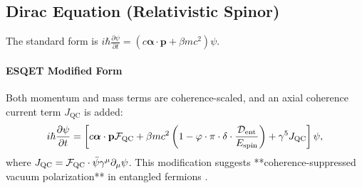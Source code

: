 \subsection{Dirac Equation (Relativistic Spinor)}

The standard form is $i \hbar \frac{\partial \psi}{\partial t} = \left( c \boldsymbol{\alpha} \cdot \mathbf{p} + \beta m c^2 \right) \psi$.

\paragraph{ESQET Modified Form}
Both momentum and mass terms are coherence-scaled, and an axial coherence current term $J_{\text{QC}}$ is added:
\[
i \hbar \frac{\partial \psi}{\partial t} = \left[ c \boldsymbol{\alpha} \cdot \mathbf{p} \mathcal{F}_{\text{QC}} + \beta m c^2 \left(1 - \varphi \cdot \pi \cdot \mathbf{\delta} \cdot \frac{\mathcal{D}_{\text{ent}}}{E_{\text{spin}}} \right) + \gamma^5 J_{\text{QC}} \right] \psi,
\]
where $J_{\text{QC}} = \mathcal{F}_{\text{QC}} \cdot \bar{\psi} \gamma^\mu \partial_\mu \psi$. This modification suggests **coherence-suppressed vacuum polarization** in entangled fermions \cite{penroseHameroff}.

